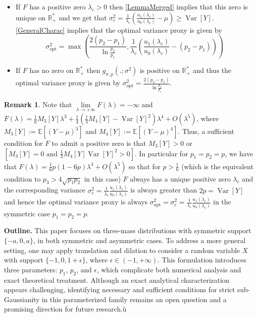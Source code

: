 \documentclass[a4paper, 10pt]{article}
\newcommand{\beq}{\begin{equation}}
\newcommand{\eeq}{\end{equation}}
\theoremstyle{definition}
\newtheorem{remark}{Remark}[section]
\begin{document}
\begin{itemize}
    \item If $F$ has a positive zero $\lambda_c>0$ then \autoref{LemmaMerged} implies that this zero is unique on $\mathbb{R}_+^*$ and we get that $\sigma_c^2=\frac{1}{\lambda_c}\left(\frac{u_1(\lambda_c)}{u_0(\lambda_c)}-\mu\right)\geq\operatorname{Var}[Y]$. \autoref{GeneralCharac} implies that the optimal variance proxy is given by
    \beq \sigma_{\mathrm{opt}}^2=\max\left(\frac{2(p_2-p_1)}{\ln \frac{p_2}{p_1}}, \frac{1}{\lambda_c}\left(\frac{u_1(\lambda_c)}{u_0(\lambda_c)}-(p_2-p_1)\right) \right)\eeq
    \item If $F$ has no zero on $\mathbb{R}_+^*$ then $g_{\sigma, p}(.;\sigma^2)$ is positive on $\mathbb{R}_+^*$ and thus the optimal variance proxy is given by $\sigma^2_{\text{opt}}=\frac{2(p_2-p_1)}{\ln \frac{p_2}{p_1}}$.
\end{itemize}

\begin{remark}Note that $\underset{\lambda\to +\infty}{\lim} F(\lambda)=-\infty$ and $F(\lambda)=\frac{1}{6}M_3[Y]\lambda^3+\frac{1}{4}\left(\frac{1}{3}M_4[Y]-\operatorname{Var}[Y]^2\right)\lambda^4+ O(\lambda^5)$, where $M_3[Y]:=\mathbb{E}[(Y-\mu)^3]$ and $M_4[Y]:=\mathbb{E}[(Y-\mu)^4]$. Thus, a sufficient condition for $F$ to admit a positive zero is that $M_3[Y]>0$ or $\left[M_3[Y]=0 \text{ and } \frac{1}{3}M_4[Y]\operatorname{Var}[Y]^2>0\right]$. In particular for $p_1=p_2=p$, we have that $F(\lambda)=\frac{1}{6}p(1-6p)\lambda^4+O(\lambda^5)$ so that for $p>\frac{1}{6}$ (which is the equivalent condition to $p_3>4\sqrt{p_1p_2}$ in this case) $F$ always has a unique positive zero $\lambda_c$ and the corresponding variance $\sigma_c^2=\frac{1}{\lambda_c}\frac{u_1(\lambda_c)}{u_0(\lambda_c)}$ is always greater than $2p=\operatorname{Var}[Y]$ and hence the optimal variance proxy is always $\sigma_{\mathrm{opt}}^2=\sigma_c^2=\frac{1}{\lambda_c}\frac{u_1(\lambda_c)}{u_0(\lambda_c)}$ in the symmetric case $p_1=p_2=p$.
\end{remark}

{\textbf{Outline.}} This paper focuses on three-mass distributions with symmetric support $\{-a, 0, a\}$, in both symmetric and asymmetric cases. To address a more general setting, one may apply translation and dilation to consider a random variable $X$ with support $\{-1, 0, 1+\epsilon\}$, where $\epsilon \in (-1, +\infty)$. This formulation introduces three parameters: $p_1$, $p_2$, and $\epsilon$, which complicate both numerical analysis and exact theoretical treatment. Although an exact analytical characterization appears challenging, identifying necessary and sufficient conditions for strict sub-Gaussianity in this parameterized family remains an open question and a promising direction for future research.ù
\end{document}
